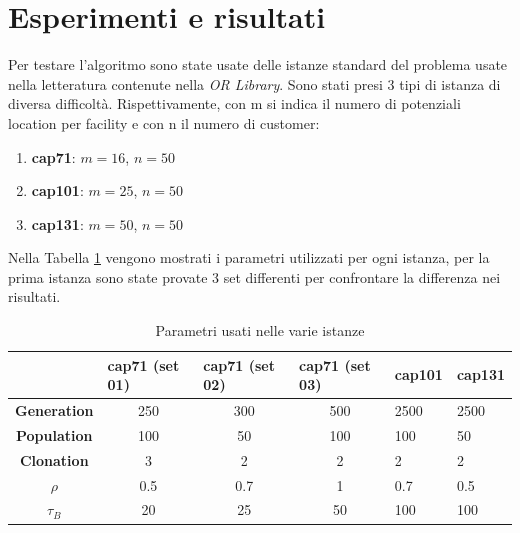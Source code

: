 \documentclass[a4paper,12pt,titlepage,oneside]{article}
\begin{document}
\section{Esperimenti e risultati}
Per testare l'algoritmo sono state usate delle istanze standard del problema usate nella letteratura contenute nella \textit{OR Library}\cite{Beasley1990}. Sono stati presi 3 tipi di istanza di diversa difficoltà. Rispettivamente, con m si indica il numero di potenziali location per facility e con n il numero di customer: 
\begin{enumerate}
  \item \textbf{cap71}: $m = 16$, $n = 50$
  \item \textbf{cap101}: $m = 25$, $n = 50$
  \item \textbf{cap131}: $m = 50$, $n = 50$
\end{enumerate}
 Nella Tabella \ref{table:1} vengono mostrati i parametri utilizzati per ogni istanza, per la prima istanza sono state provate 3 set differenti per confrontare la differenza nei risultati.
\begin{table}[h!]
\begin{tabular}{c|c|c|c|l|l|}
\cline{2-6}
\multicolumn{1}{l|}{}                     & \multicolumn{1}{l|}{\textbf{cap71 (set 01)}} & \multicolumn{1}{l|}{\textbf{cap71 (set 02)}} & \multicolumn{1}{l|}{\textbf{cap71 (set 03)}} & \textbf{cap101} & \textbf{cap131} \\ \hline
\multicolumn{1}{|c|}{\textbf{Generation}} & 250                                          & 300                                          & 500                                          & 2500            & 2500            \\ \hline
\multicolumn{1}{|c|}{\textbf{Population}} & 100                                          & 50                                           & 100                                          & 100             & 50              \\ \hline
\multicolumn{1}{|c|}{\textbf{Clonation}}  & 3                                            & 2                                            & 2                                            & 2               & 2               \\ \hline
\multicolumn{1}{|c|}{\textbf{$\rho$}}        & 0.5                                          & 0.7                                          & 1                                          & 0.7             & 0.5             \\ \hline
\multicolumn{1}{|c|}{\textbf{$\tau_{B}$}}       & 20                                           & 25                                        & 50                                        & 100             & 100             \\ \hline
\end{tabular}
\caption{Parametri usati nelle varie istanze}
\label{table:1}
\end{table}
\end{document}
